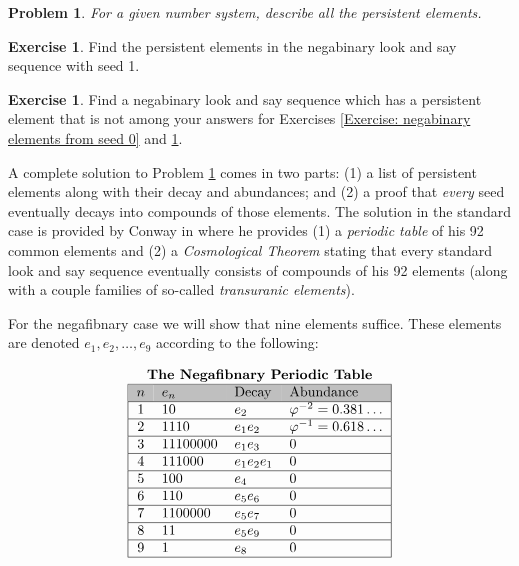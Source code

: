 \documentclass[reqno]{amsart}
\newtheorem{problem}{Problem}
\theoremstyle{definition}
\newtheorem{exercise}[theorem]{Exercise}
\begin{document}
\begin{problem}\label{problem:: cosmological theorem}
    For a given number system, describe all the persistent elements.
\end{problem} 

\begin{exercise}\label{exercise: negabinary elements from seed 1}
    Find the persistent elements in the negabinary look and say sequence with seed 1. 
\end{exercise}

\begin{exercise}
    Find a negabinary look and say sequence which has a persistent  element that is not among your answers for Exercises \ref{Exercise: negabinary elements from seed 0} and \ref{exercise: negabinary elements from seed 1}.
\end{exercise}

A complete solution to Problem \ref{problem:: cosmological theorem} comes in two parts: (1) a list of persistent elements along with their decay and abundances; and (2) a proof that \emph{every} seed eventually decays into compounds of those elements. The solution in the standard case is provided by Conway in \cite{Conway} where he provides (1) a \emph{periodic table} of his 92 common elements and (2) a \emph{Cosmological Theorem} stating that every standard look and say sequence eventually consists of compounds of his 92 elements (along with a couple families of so-called \emph{transuranic elements}). 

For the negafibnary case we will show that nine elements suffice. These elements are denoted $e_1, e_2,\ldots, e_9$ according to the following:

\begin{equation}\label{table:: negafibnary periodic table}
\begin{tabular}{|clll|}
\multicolumn{4}{c}{\textbf{The Negafibnary Periodic Table}} \\ \hline
\rowcolor{lightgray}
$n$ & $e_n$ & \text{Decay} & \text{Abundance} \\ \hline
1 & 10 & $e_2$ & $\varphi^{-2}=0.381\ldots$ \\ \hline
2 & 1110 & $e_1e_2$ & $\varphi^{-1}=0.618\ldots$ \\ \hline
3 & 11100000 & $e_1e_3$ & 0 \\ \hline
4 & 111000 & $e_1e_2e_1$ & 0 \\ \hline
5 & 100 & $e_4$ & 0 \\ \hline
6 & 110 & $e_5e_6$ & 0 \\ \hline
7 & 1100000 & $e_5e_7$ & 0 \\ \hline
8 & 11 & $e_5e_9$ & 0 \\ \hline
9 & 1 & $e_8$ & 0 \\ \hline
\end{tabular}
\end{equation}
\end{document}
